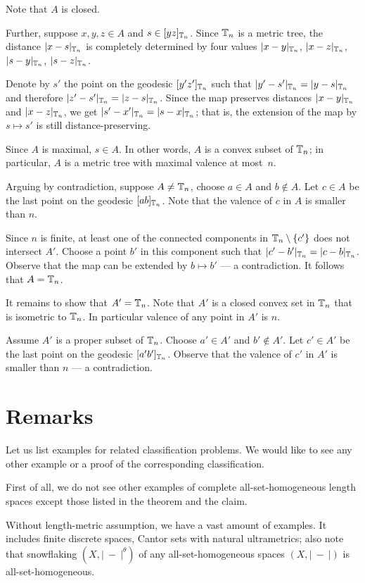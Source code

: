 \documentclass[a4paper,10pt]{article}
\begin{document}
Note that $A$ is closed.

Further, suppose $x,y,z\in A$ and $s\in [yz]_{\mathbb{T}_n}$.
Since $\mathbb{T}_n$ is a metric tree, the distance $|x-s|_{\mathbb{T}_n}$ is completely determined by four values $|x-y|_{\mathbb{T}_n}$, $|x-z|_{\mathbb{T}_n}$, $|s-y|_{\mathbb{T}_n}$, $|s-z|_{\mathbb{T}_n}$.

Denote by $s'$ the point on the geodesic $[y'z']_{\mathbb{T}_n}$ such that $|y'-s'|_{\TT_n}\z=|y-s|_{\TT_n}$ and therefore $|z'-s'|_{\mathbb{T}_n}=|z-s|_{\mathbb{T}_n}$.
Since the map preserves distances $|x-y|_{\mathbb{T}_n}$ and $|x-z|_{\mathbb{T}_n}$, we get $|s'-x'|_{\mathbb{T}_n}=|s-x|_{\mathbb{T}_n}$;
that is, the extension of the map by $s\mapsto s'$ is still distance-preserving.

Since $A$ is maximal, $s\in A$.
In other words, $A$ is a convex subset of $\mathbb{T}_n$;
in particular, $A$ is a metric tree with maximal valence at most~$n$.

Arguing by contradiction, suppose $A\ne \mathbb{T}_n$, choose $a\in A$ and $b\notin A$. 
Let $c\in A$ be the last point on the geodesic $[ab]_{\mathbb{T}_n}$.
Note that the valence of $c$ in $A$ is smaller than $n$.

Since $n$ is finite, at least one of the connected components in $\TT_n\z\setminus \{c'\}$ does not intersect $A'$.
Choose a point $b'$ in this component such that $|c'-b'|_{\mathbb{T}_n}=|c-b|_{\mathbb{T}_n}$.
Observe that the map can be extended by $b\mapsto b'$ --- a contradiction.
It follows that $A=\mathbb{T}_n$.

It remains to show that $A'=\mathbb{T}_n$.
Note that $A'$ is a closed convex set in $\mathbb{T}_n$ that is isometric to $\mathbb{T}_n$.
In particular valence of any point in $A'$ is $n$.

Assume $A'$ is a proper subset of $\mathbb{T}_n$.
Choose $a'\in A'$ and $b'\notin A'$.
Let $c'\in A'$ be the last point on the geodesic $[a'b']_{\mathbb{T}_n}$.
Observe that the valence of $c'$ in $A'$ is smaller than $n$ --- a contradiction.
\qeds

\section{Remarks}


Let us list examples for related classification problems.
We would like to see any other example or a proof of the corresponding classification. 

First of all, we do not see other examples of complete all-set-homogeneous length spaces except those listed in the theorem and the claim.

Without length-metric assumption, we have a vast amount of examples.
It includes finite discrete spaces, Cantor sets with natural ultrametrics;
also note that snowflaking $(X,|\ -\ |^\theta)$ of any all-set-homogeneous spaces $(X,|\ -\ |)$ is all-set-homogeneous.
\end{document}
